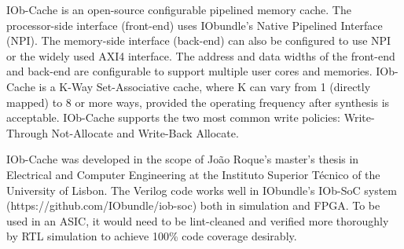 IOb-Cache is an open-source configurable pipelined memory cache. The
processor-side interface (front-end) uses IObundle's Native Pipelined Interface
(NPI). The memory-side interface (back-end) can also be configured to use NPI or
the widely used AXI4 interface. The address and data widths of the front-end and
back-end are configurable to support multiple user cores and memories. IOb-Cache
is a K-Way Set-Associative cache, where K can vary from 1 (directly mapped) to 8
or more ways, provided the operating frequency after synthesis is
acceptable. IOb-Cache supports the two most common write policies: Write-Through
Not-Allocate and Write-Back Allocate.

IOb-Cache was developed in the scope of João Roque's master's thesis in
Electrical and Computer Engineering at the Instituto Superior Técnico of the
University of Lisbon. The Verilog code works well in IObundle's IOb-SoC system
(https://github.com/IObundle/iob-soc) both in simulation and FPGA. To be used in
an ASIC, it would need to be lint-cleaned and verified more thoroughly by RTL
simulation to achieve 100\% code coverage desirably.
